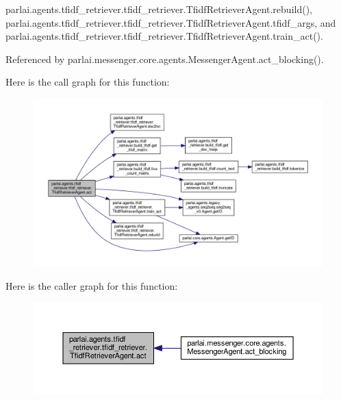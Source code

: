 parlai.\+agents.\+tfidf\+\_\+retriever.\+tfidf\+\_\+retriever.\+Tfidf\+Retriever\+Agent.\+rebuild(), parlai.\+agents.\+tfidf\+\_\+retriever.\+tfidf\+\_\+retriever.\+Tfidf\+Retriever\+Agent.\+tfidf\+\_\+args, and parlai.\+agents.\+tfidf\+\_\+retriever.\+tfidf\+\_\+retriever.\+Tfidf\+Retriever\+Agent.\+train\+\_\+act().



Referenced by parlai.\+messenger.\+core.\+agents.\+Messenger\+Agent.\+act\+\_\+blocking().

Here is the call graph for this function\+:
\nopagebreak
\begin{figure}[H]
\begin{center}
\leavevmode
\includegraphics[width=350pt]{classparlai_1_1agents_1_1tfidf__retriever_1_1tfidf__retriever_1_1TfidfRetrieverAgent_a6113bcdd2792d70156ca64cc57187692_cgraph}
\end{center}
\end{figure}
Here is the caller graph for this function\+:
\nopagebreak
\begin{figure}[H]
\begin{center}
\leavevmode
\includegraphics[width=350pt]{classparlai_1_1agents_1_1tfidf__retriever_1_1tfidf__retriever_1_1TfidfRetrieverAgent_a6113bcdd2792d70156ca64cc57187692_icgraph}
\end{center}
\end{figure}
\mbox{\label{classparlai_1_1agents_1_1tfidf__retriever_1_1tfidf__retriever_1_1TfidfRetrieverAgent_a3d8b2fdf6981564efc1a4db42029b4f0}} 
